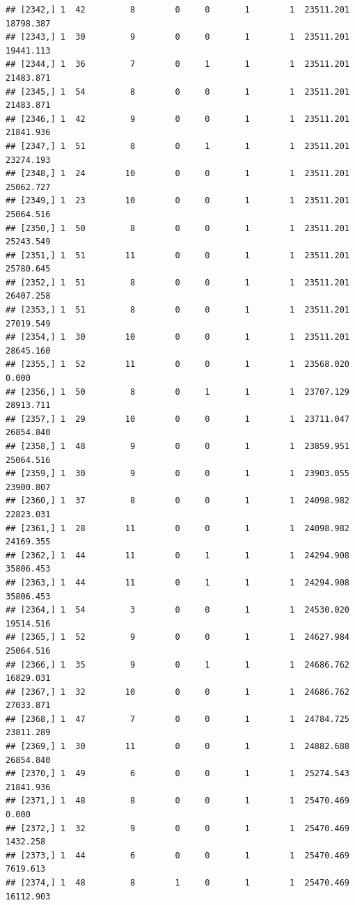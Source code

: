 \documentclass[
]{article}
\begin{document}
\begin{verbatim}
## [2342,] 1  42         8        0     0       1        1  23511.201  18798.387
## [2343,] 1  30         9        0     0       1        1  23511.201  19441.113
## [2344,] 1  36         7        0     1       1        1  23511.201  21483.871
## [2345,] 1  54         8        0     0       1        1  23511.201  21483.871
## [2346,] 1  42         9        0     0       1        1  23511.201  21841.936
## [2347,] 1  51         8        0     1       1        1  23511.201  23274.193
## [2348,] 1  24        10        0     0       1        1  23511.201  25062.727
## [2349,] 1  23        10        0     0       1        1  23511.201  25064.516
## [2350,] 1  50         8        0     0       1        1  23511.201  25243.549
## [2351,] 1  51        11        0     0       1        1  23511.201  25780.645
## [2352,] 1  51         8        0     0       1        1  23511.201  26407.258
## [2353,] 1  51         8        0     0       1        1  23511.201  27019.549
## [2354,] 1  30        10        0     0       1        1  23511.201  28645.160
## [2355,] 1  52        11        0     0       1        1  23568.020      0.000
## [2356,] 1  50         8        0     1       1        1  23707.129  28913.711
## [2357,] 1  29        10        0     0       1        1  23711.047  26854.840
## [2358,] 1  48         9        0     0       1        1  23859.951  25064.516
## [2359,] 1  30         9        0     0       1        1  23903.055  23900.807
## [2360,] 1  37         8        0     0       1        1  24098.982  22823.031
## [2361,] 1  28        11        0     0       1        1  24098.982  24169.355
## [2362,] 1  44        11        0     1       1        1  24294.908  35806.453
## [2363,] 1  44        11        0     1       1        1  24294.908  35806.453
## [2364,] 1  54         3        0     0       1        1  24530.020  19514.516
## [2365,] 1  52         9        0     0       1        1  24627.984  25064.516
## [2366,] 1  35         9        0     1       1        1  24686.762  16829.031
## [2367,] 1  32        10        0     0       1        1  24686.762  27033.871
## [2368,] 1  47         7        0     0       1        1  24784.725  23811.289
## [2369,] 1  30        11        0     0       1        1  24882.688  26854.840
## [2370,] 1  49         6        0     0       1        1  25274.543  21841.936
## [2371,] 1  48         8        0     0       1        1  25470.469      0.000
## [2372,] 1  32         9        0     0       1        1  25470.469   1432.258
## [2373,] 1  44         6        0     0       1        1  25470.469   7619.613
## [2374,] 1  48         8        1     0       1        1  25470.469  16112.903

\end{verbatim}
\end{document}
